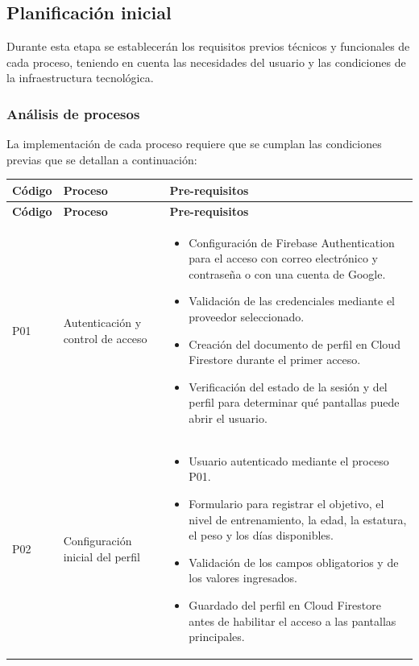 \subsection{Planificación inicial}
Durante esta etapa se establecerán los requisitos previos técnicos y funcionales de cada
proceso, teniendo en cuenta las necesidades del usuario y las condiciones de la infraestructura tecnológica.

\subsubsection{Análisis de procesos}

La implementación de cada proceso requiere que se cumplan las condiciones 
previas que se detallan a continuación:

{\small
\begin{longtable}{|L{1.3cm}|L{3.3cm}|L{9cm}|}
\hline
{}
\textbf{Código} & \textbf{Proceso} & \textbf{Pre-requisitos} \\
\hline
\endfirsthead

\hline
{}
\textbf{Código} & \textbf{Proceso} & \textbf{Pre-requisitos} \\
\hline
\endhead

P01 & Autenticación y control de acceso &
\begin{itemize}
    \item Configuración de Firebase Authentication para el acceso con correo
    electrónico y contraseña o con una cuenta de Google.
    \item Validación de las credenciales mediante el proveedor seleccionado.
    \item Creación del documento de perfil en Cloud Firestore durante el primer
    acceso.
    \item Verificación del estado de la sesión y del perfil para determinar
    qué pantallas puede abrir el usuario.
\end{itemize}
\\ \hline

P02 & Configuración inicial del perfil &
\begin{itemize}
    \item Usuario autenticado mediante el proceso P01.
    \item Formulario para registrar el objetivo, el nivel de entrenamiento,
    la edad, la estatura, el peso y los días disponibles.
    \item Validación de los campos obligatorios y de los valores ingresados.
    \item Guardado del perfil en Cloud Firestore antes de habilitar el acceso
    a las pantallas principales.
\end{itemize}
\\ \hline


\end{longtable}}
